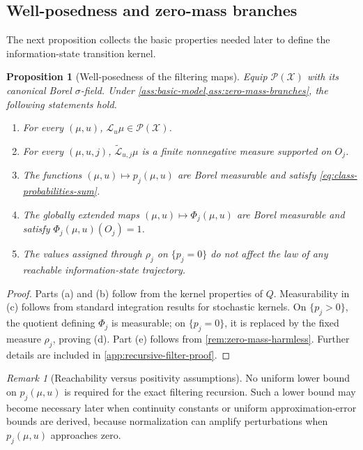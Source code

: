 \documentclass[10pt,twocolumn]{article}
\newtheorem{proposition}{Proposition}
\theoremstyle{remark}
\newtheorem{remark}{Remark}
\newcommand{\Pcal}{\mathcal{P}}
\newcommand{\Xcal}{\mathcal{X}}
\begin{document}
\subsection{Well-posedness and zero-mass branches}
\label{subsec:well-posedness-filter}

The next proposition collects the basic properties needed later to define the information-state transition kernel.

\begin{proposition}[Well-posedness of the filtering maps]
	\label{prop:filter-well-posedness}
	Equip \(\Pcal(\Xcal)\) with its canonical Borel \(\sigma\)-field. Under \cref{ass:basic-model,ass:zero-mass-branches}, the following statements hold.
	\begin{enumerate}[label=\textnormal{(\alph*)},leftmargin=*]
		\item For every \((\mu,u)\), \(\mathcal L_u\mu\in\Pcal(\Xcal)\).
		\item For every \((\mu,u,j)\), \(\widetilde{\mathcal L}_{u,j}\mu\) is a finite nonnegative measure supported on \(O_j\).
		\item The functions \((\mu,u)\mapsto p_j(\mu,u)\) are Borel measurable and satisfy \cref{eq:class-probabilities-sum}.
		\item The globally extended maps \((\mu,u)\mapsto\Phi_j(\mu,u)\) are Borel measurable and satisfy \(\Phi_j(\mu,u)(O_j)=1\).
		\item The values assigned through \(\rho_j\) on \(\{p_j=0\}\) do not affect the law of any reachable information-state trajectory.
	\end{enumerate}
\end{proposition}

\begin{proof}
	Parts (a) and (b) follow from the kernel properties of \(Q\). Measurability in (c) follows from standard integration results for stochastic kernels. On \(\{p_j>0\}\), the quotient defining \(\Phi_j\) is measurable; on \(\{p_j=0\}\), it is replaced by the fixed measure \(\rho_j\), proving (d). Part (e) follows from \cref{rem:zero-mass-harmless}. Further details are included in \cref{app:recursive-filter-proof}.
\end{proof}

\begin{remark}[Reachability versus positivity assumptions]
	\label{rem:reachability-positivity}
	No uniform lower bound on \(p_j(\mu,u)\) is required for the exact filtering recursion. Such a lower bound may become necessary later when continuity constants or uniform approximation-error bounds are derived, because normalization can amplify perturbations when \(p_j(\mu,u)\) approaches zero.
\end{remark}
\end{document}
